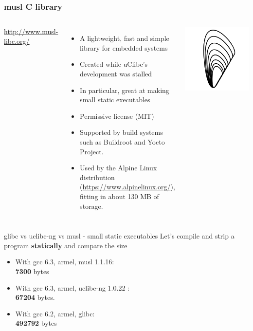\begin{frame}
  \frametitle{musl C library}
  \begin{columns}
      \url{http://www.musl-libc.org/}
      \begin{itemize}
      \item A lightweight, fast and simple library for embedded systems
      \item Created while uClibc's development was stalled
      \item In particular, great at making small static executables
      \item Permissive license (MIT)
      \item Supported by build systems such as Buildroot and Yocto
        Project.
      \item Used by the Alpine Linux distribution
        (\url{https://www.alpinelinux.org/}), fitting in about 130 MB of storage.
      \end{itemize}
    \includegraphics[width=\textwidth]{slides/c-libraries/musl.png}
  \end{columns}
\end{frame}

\begin{frame}{glibc vs uclibc-ng vs musl - small static executables}
  Let's compile and strip a  program {\bf statically} and
compare the size
  \begin{itemize}
    \item With gcc 6.3, armel, musl 1.1.16:\\
          {\bf 7300} bytes
    \item With gcc 6.3, armel, uclibc-ng 1.0.22 :\\
          {\bf 67204} bytes.
    \item With gcc 6.2, armel, glibc:\\
          {\bf 492792} bytes
  \end{itemize}
\end{frame}

